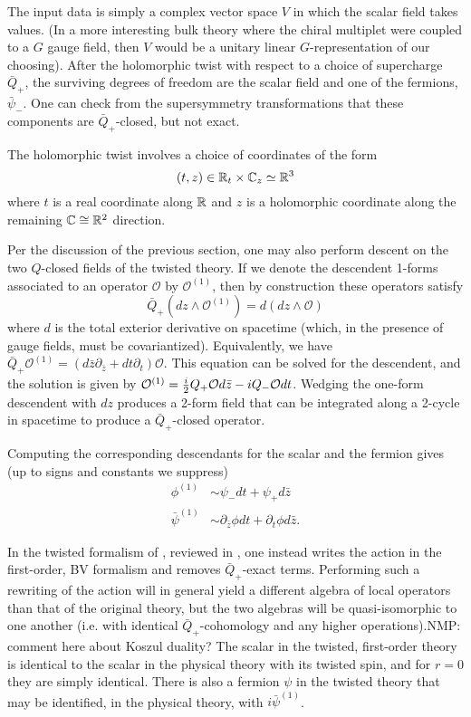 \documentclass[11pt]{amsart}
\def\natalie#1{{\textcolor{green!65!black}{NMP: {#1}}}}
\begin{document}
The input data is simply a complex vector space $V$ in which the scalar field takes values. (In a more interesting bulk theory where the chiral multiplet were coupled to a $G$ gauge field, then $V$ would be a unitary linear $G$-representation of our choosing). After the holomorphic twist with respect to a choice of supercharge $\bar{Q}_+$, the surviving degrees of freedom are the scalar field and one of the fermions, $\bar{\psi}_-$. One can check from the supersymmetry transformations that these components are $\bar{Q}_+$-closed, but not exact. 

The holomorphic twist involves a choice of coordinates of the form
\[
(t , z) \in \mathbb R_t \times \mathbb C_z \simeq \mathbb R^3
\]
where $t$ is a real coordinate along $\mathbb R$ and $z$ is a holomorphic coordinate along the remaining $\mathbb C \cong \mathbb R^2$ direction. 

Per the discussion of the previous section, one may also perform descent on the two $Q$-closed fields of the twisted theory. If we denote the descendent 1-forms associated to an operator $\mathcal{O}$ by $\mathcal{O}^{(1)}$, then by construction these operators satisfy
\[
\bar{Q}_+(dz \wedge \mathcal{O}^{(1)}) = d (dz \wedge \mathcal{O})
\]
where $d$ is the total exterior derivative on spacetime (which, in the presence of gauge fields, must be covariantized). Equivalently, we have $\bar{Q}_{+}\mathcal{O}^{(1)} = (d\bar{z}\partial_{\bar{z}} + dt \partial_t)\mathcal{O}$. This equation can be solved for the descendent, and the solution is given by $\mathcal{O}^{(1)} = {i \over 2}Q_+ \mathcal{O} d\bar{z} - i Q_- \mathcal{O} dt$. Wedging the one-form descendent with $dz$ produces a 2-form field that can be integrated along a 2-cycle in spacetime to produce a $\bar{Q}_+$-closed operator. 

Computing the corresponding descendants for the scalar and the fermion gives (up to signs and constants we suppress)
\begin{align}
\phi^{(1)} &\sim \psi_{-}dt + \psi_+ d\bar{z} \\
\bar{\psi}^{(1)} &\sim \partial_{\bar{z}}\phi dt + \partial_t \phi d\bar{z}.
\end{align}

In the twisted formalism of \cite{ACNV}, reviewed in \cite{CDG}, one instead writes the action in the first-order, BV formalism and removes $\bar{Q}_+$-exact terms. Performing such a rewriting of the action will in general yield a different algebra of local operators than that of the original theory, but the two algebras will be quasi-isomorphic to one another (i.e. with identical $\bar{Q}_+$-cohomology and any higher operations).\natalie{comment here about Koszul duality?}
The scalar in the twisted, first-order theory is identical to the scalar in the physical theory with its twisted spin, and for $r=0$ they are simply identical. There is also a fermion $\psi$ in the twisted theory that may be identified, in the physical theory, with $i \bar{\psi}^{(1)}$.
\end{document}
